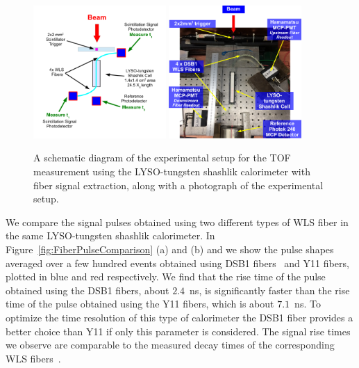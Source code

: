 \begin{figure}[h] \centering
\includegraphics[width=0.45\textwidth]{figs/ShashlikFiberSetupSchematic} 
\includegraphics[width=0.45\textwidth]{figs/ShashlikFiberSetupPhoto} 
\caption{\small A schematic diagram of the experimental setup for the
TOF measurement using the LYSO-tungsten shashlik calorimeter
with fiber signal extraction, along with a photograph of the
experimental setup. } 
\label{fig:ShashlikFiberSetup}
\end{figure}

 We compare the signal pulses obtained using two different
 types of WLS fiber in the same LYSO-tungsten shashlik calorimeter. In
 Figure~\ref{fig:FiberPulseComparison} (a) and (b) and we show the pulse shapes
 averaged over a few hundred events obtained using DSB1 fibers~\cite{Albrecht}
 and Y11 fibers, plotted in blue and red respectively. We find that the rise
 time of the pulse obtained using the DSB1 fibers, about $2.4$~ns, is
 significantly faster than the rise time of the pulse obtained using the Y11
 fibers, which is about $7.1$~ns. To optimize the time resolution of this type
 of calorimeter the DSB1 fiber provides a better choice than Y11 if only this
 parameter is considered. The signal rise times we observe are comparable to the
 measured decay times of the corresponding WLS fibers~\cite{Albrecht}. 
 
